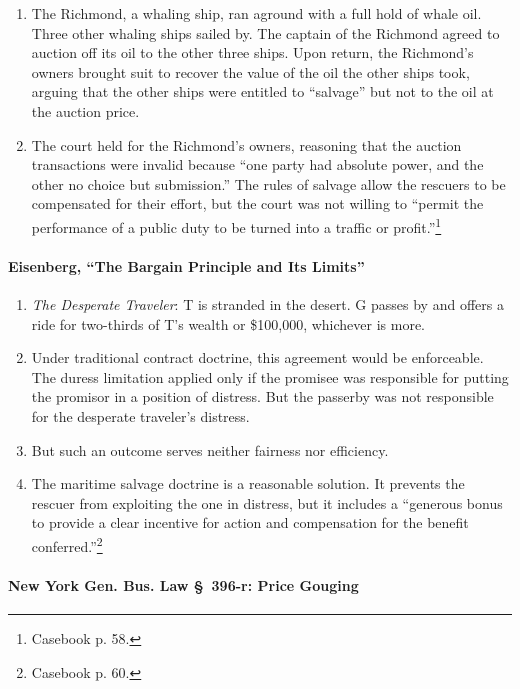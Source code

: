 \begin{enumerate}
    \item The Richmond, a whaling ship, ran aground with a full hold of whale 
    oil. Three other whaling ships sailed by. The captain of the Richmond 
    agreed to auction off its oil to the other three ships. Upon return, the 
    Richmond's owners brought suit to recover the value of the oil the other 
    ships took, arguing that the other ships were entitled to ``salvage'' but 
    not to the oil at the auction price.
    \item The court held for the Richmond's owners, reasoning that the auction 
    transactions were invalid because ``one party had absolute power, and the 
    other no choice but submission.'' The rules of salvage allow the rescuers 
    to be compensated for their effort, but the court was not willing to 
    ``permit the performance of a public duty to be turned into a traffic or 
    profit.''\footnote{Casebook p. 58.}
\end{enumerate}

\paragraph{Eisenberg, ``The Bargain Principle and Its Limits''}

\begin{enumerate}
    \item \emph{The Desperate Traveler}: T is stranded in the desert. G passes 
    by and offers a ride for two-thirds of T's wealth or \$100,000, whichever 
    is more.
    \item Under traditional contract doctrine, this agreement would be 
    enforceable. The duress limitation applied only if the promisee was 
    responsible for putting the promisor in a position of distress. But the 
    passerby was not responsible for the desperate traveler's distress.
    \item But such an outcome serves neither fairness nor efficiency.
    \item The maritime salvage doctrine is a reasonable solution. It prevents 
    the rescuer from exploiting the one in distress, but it includes a 
    ``generous bonus to provide a clear incentive for action and compensation 
    for the benefit conferred.''\footnote{Casebook p. 60.}
\end{enumerate}

\paragraph{New York Gen. Bus. Law \S\ 396-r: Price Gouging}

